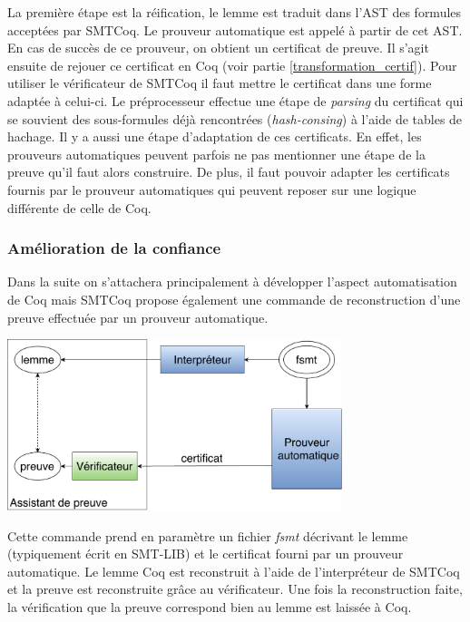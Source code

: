 \documentclass[11pt]{article}
\begin{document}
La première étape est la réification, le lemme est traduit dans l'AST des formules acceptées par SMTCoq. Le prouveur automatique est appelé à partir de cet AST. En cas de succès de ce prouveur, on obtient un certificat de preuve. 
Il s'agit ensuite de rejouer ce certificat en Coq (voir partie \ref{transformation_certif}). Pour utiliser le vérificateur de SMTCoq il faut mettre le certificat dans une forme adaptée à celui-ci. Le préprocesseur effectue une étape de \textit{parsing} du certificat qui se souvient des sous-formules déjà rencontrées (\textit{hash-consing}) à l'aide de tables de hachage.  Il y a aussi une étape d'adaptation de ces certificats. En effet, les prouveurs automatiques peuvent parfois ne pas mentionner une étape de la preuve qu'il faut alors construire. De plus, il faut pouvoir adapter les certificats fournis par le prouveur automatiques qui peuvent reposer sur une logique différente de celle de Coq. 


\subsubsection{Amélioration de la confiance} \label{confiance}

Dans la suite on s'attachera principalement à développer l'aspect automatisation de Coq mais SMTCoq propose également une commande de reconstruction d'une preuve effectuée par un prouveur automatique.

\begin{center}
\includegraphics[height=5cm]{Confiance.pdf}
\end{center}

Cette commande prend en paramètre un fichier \textit{fsmt} décrivant le lemme (typiquement écrit en SMT-LIB) et le certificat fourni par un prouveur automatique. Le lemme Coq est reconstruit à l'aide de l'interpréteur de SMTCoq et la preuve est reconstruite grâce au vérificateur. Une fois la reconstruction faite, la vérification que la preuve correspond bien au lemme est laissée à Coq. \\
\end{document}
